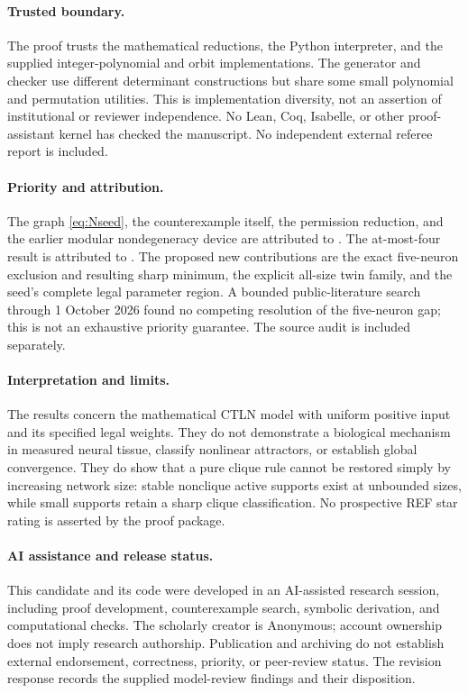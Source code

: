 \documentclass[11pt,a4paper]{article}
\theoremstyle{definition}\newtheorem{definition}[theorem]{Definition}
\theoremstyle{remark}\newtheorem{remark}[theorem]{Remark}
\begin{document}
\paragraph{Trusted boundary.}
The proof trusts the mathematical reductions, the Python interpreter, and the supplied integer-polynomial and orbit implementations. The generator and checker use different determinant constructions but share some small polynomial and permutation utilities. This is implementation diversity, not an assertion of institutional or reviewer independence. No Lean, Coq, Isabelle, or other proof-assistant kernel has checked the manuscript. No independent external referee report is included.

\paragraph{Priority and attribution.}
The graph \eqref{eq:Nseed}, the counterexample itself, the permission reduction, and the earlier modular nondegeneracy device are attributed to \cite{G2026}. The at-most-four result is attributed to \cite{CGM2024}. The proposed new contributions are the exact five-neuron exclusion and resulting sharp minimum, the explicit all-size twin family, and the seed's complete legal parameter region. A bounded public-literature search through 1 October 2026 found no competing resolution of the five-neuron gap; this is not an exhaustive priority guarantee. The source audit is included separately.

\paragraph{Interpretation and limits.}
The results concern the mathematical CTLN model with uniform positive input and its specified legal weights. They do not demonstrate a biological mechanism in measured neural tissue, classify nonlinear attractors, or establish global convergence. They do show that a pure clique rule cannot be restored simply by increasing network size: stable nonclique active supports exist at unbounded sizes, while small supports retain a sharp clique classification. No prospective REF star rating is asserted by the proof package.

\paragraph{AI assistance and release status.}
This candidate and its code were developed in an AI-assisted research session, including proof development, counterexample search, symbolic derivation, and computational checks. The scholarly creator is Anonymous; account ownership does not imply research authorship. Publication and archiving do not establish external endorsement, correctness, priority, or peer-review status. The revision response records the supplied model-review findings and their disposition.
\end{document}
